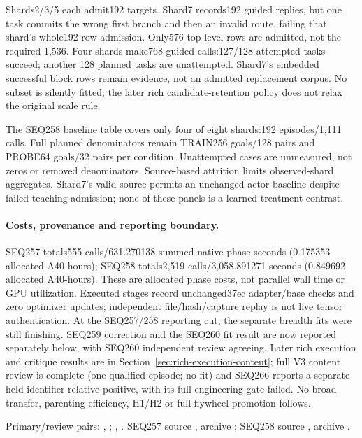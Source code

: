 \documentclass{article}
\begin{document}
Shards2/3/5 each admit192 targets. Shard7 records192 guided replies, but one task
commits the wrong first branch and then an invalid route, failing that shard's
whole192-row admission. Only576 top-level rows are admitted, not the required
1,536. Four shards make768 guided calls:127/128 attempted tasks succeed; another
128 planned tasks are unattempted. Shard7's embedded successful block rows remain
evidence, not an admitted replacement corpus. No subset is silently fitted;
the later rich candidate-retention policy does not relax the original scale rule.

The SEQ258 baseline table covers only four of eight shards:192 episodes/1,111
calls. Full planned denominators remain TRAIN256 goals/128 pairs and PROBE64
goals/32 pairs per condition. Unattempted cases are unmeasured, not zeros or
removed denominators. Source-based attrition limits observed-shard aggregates.
Shard7's valid source permits an unchanged-actor baseline despite failed teaching
admission; none of these panels is a learned-treatment contrast.

\paragraph{Costs, provenance and reporting boundary.}
SEQ257 totals555 calls/631.270138 summed native-phase seconds (0.175353 allocated
A40-hours); SEQ258 totals2,519 calls/3,058.891271 seconds (0.849692 allocated
A40-hours). These are allocated phase costs, not parallel wall time or GPU
utilization. Executed stages record unchanged37ec adapter/base checks and zero
optimizer updates; independent file/hash/capture replay is not live tensor
authentication. At the SEQ257/258 reporting cut, the separate breadth fits were
still finishing. SEQ259 correction and the SEQ260 fit result are now reported
separately below, with SEQ260 independent review agreeing. Later rich execution
and critique results are in Section~\ref{sec:rich-execution-content}; full V3
content review is complete (one qualified episode; no fit) and SEQ266 reports
a separate held-identifier relative positive, with its full engineering gate failed. No broad transfer, parenting
efficiency, H1/H2 or full-flywheel promotion follows.

Primary/review pairs:
,
;
,
.
SEQ257 source , archive
;
SEQ258 source , archive
.
\end{document}
